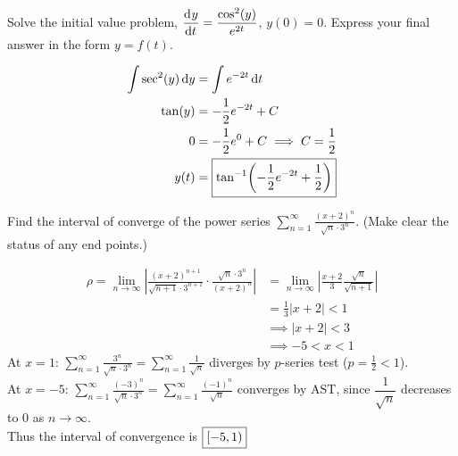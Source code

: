\documentclass[12pt,answers]{exam}
\begin{document}
\begin{questions}

\newpage
\question[12]
Solve the initial value problem, $\displaystyle \dod{y}{t} = \frac{\cos^2(y)}{e^{2t}}$, $y(0) = 0$. Express your final answer in the form $y = f(t)$.
\begin{solution}
    \begin{align*}
        \int \sec^2(y) \dif y &= \int e^{-2t} \dif t \\ 
        \tan(y) &= -\frac12 e^{-2t} + C \\ 
        0 &= -\frac12 e^0 + C \implies C = \frac12 \\
        y(t) &= \boxed{\tan[-1](-\frac12 e^{-2t} + \frac12)}
    \end{align*}
\end{solution}

\question[12]
Find the interval of converge of the power series $\displaystyle \sum_{n=1}^\infty \frac{(x+2)^n}{\sqrt n \cdot 3^n}$.
(Make clear the status of any end points.)
\begin{solution}
    \begin{align*}
        \rho 
        = \lim_{n\to\infty} \left| \frac{(x+2)^{n+1}}{\sqrt{n+1} \cdot 3^{n+1}} \cdot \frac{\sqrt n \cdot 3^n}{(x+2)^n} \right| 
        &= \lim_{n\to\infty} \left| \frac{x+2}{3} \frac{\sqrt{n}}{\sqrt{n+1}} \right| \\
        &= \frac13 |x+2| < 1 \\
        &\implies |x+2| < 3 \\ 
        &\implies -5 < x < 1
    \end{align*}
    At $x = 1$: 
        $\displaystyle \sum_{n=1}^\infty \frac{3^n}{\sqrt n \cdot 3^n}
        = 
        \sum_{n=1}^\infty \frac{1}{\sqrt n } 
        $
        diverges by $p$-series test ($p=\frac12 < 1$).
    \\
    At $x = -5$:
    $\displaystyle
        \sum_{n=1}^\infty \frac{(-3)^n}{\sqrt n \cdot 3^n}
        = 
        \sum_{n=1}^\infty \frac{(-1)^n}{\sqrt n} 
    $
       converges by AST, since $\dfrac{1}{\sqrt{n}}$ decreases to 0 as $n\to\infty$.
    \\
    Thus the interval of convergence is $\boxed{\intco{-5, 1}}$
\end{solution}


\end{questions}
\end{document}
